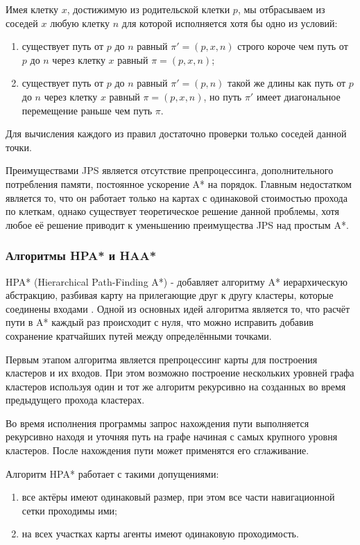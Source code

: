 Имея клетку $x$, достижимую из родительской клетки $p$, мы отбрасываем из соседей $x$ любую клетку $n$ для которой исполняется хотя бы одно из условий:

\begin{enumerate}
	\item существует путь от $p$ до $n$ равный $\pi'=(p,x,n)$ строго короче чем путь от $p$ до $n$ через клетку $x$ равный $\pi=(p,x,n)$;
	\item существует путь от $p$ до $n$ равный $\pi'=(p,n)$ такой же длины как путь от $p$ до $n$ через клетку $x$ равный $\pi=(p,x,n)$, но путь $\pi'$ имеет диагональное перемещение раньше чем путь $\pi$. 
\end{enumerate}

Для вычисления каждого из правил достаточно проверки только соседей данной точки.  

Преимуществами JPS является отсутствие препроцессинга, дополнительного потребления памяти, постоянное ускорение A* на порядок. Главным недостатком является то, что он работает только на картах с одинаковой стоимостью прохода по клеткам, однако существует теоретическое решение данной проблемы, хотя любое её решение приводит к уменьшению преимущества JPS над простым A*.


\subsubsection{Алгоритмы HPA* и HAA*}

HPA* (Hierarchical Path-Finding A*) - добавляет алгоритму A* иерархическую абстракцию, разбивая карту на прилегающие друг к другу кластеры, которые соединены входами \cite{HPA}. Одной из основных идей алгоритма является то, что расчёт пути в A* каждый раз происходит с нуля, что можно исправить добавив сохранение кратчайших путей между определёнными точками. 

Первым этапом алгоритма является препроцессинг карты для построения кластеров и их входов. При этом возможно построение нескольких уровней графа кластеров используя один и тот же алгоритм рекурсивно на созданных во время предыдущего прохода кластерах.

Во время исполнения программы запрос нахождения пути выполняется рекурсивно находя и уточняя путь на графе начиная с самых крупного уровня кластеров. После нахождения пути может применятся его сглаживание.


Алгоритм HPA* работает с такими допущениями:

\begin{enumerate}
    \item все актёры имеют одинаковый размер, при этом все части навигационной сетки проходимы ими;
    \item на всех участках карты агенты имеют одинаковую проходимость.
\end{enumerate}

